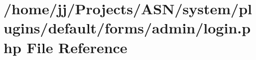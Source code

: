 \hypertarget{system_2plugins_2default_2forms_2admin_2login_8php}{}\section{/home/jj/\+Projects/\+A\+S\+N/system/plugins/default/forms/admin/login.php File Reference}
\label{system_2plugins_2default_2forms_2admin_2login_8php}
